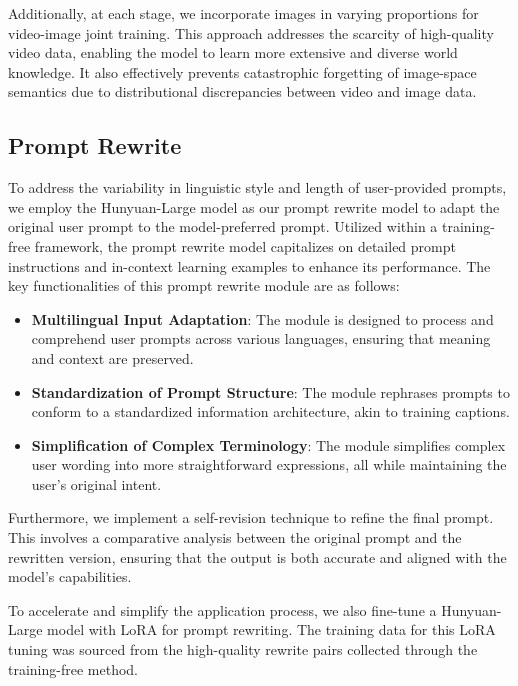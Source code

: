 Additionally, at each stage, we incorporate images in varying proportions for video-image joint training. This approach addresses the scarcity of high-quality video data, enabling the model to learn more extensive and diverse world knowledge. It also effectively prevents catastrophic forgetting of image-space semantics due to distributional discrepancies between video and image data.

\subsection{Prompt Rewrite} 
To address the variability in linguistic style and length of user-provided prompts, we employ the Hunyuan-Large model \cite{sun2024hunyuanlargeopensourcemoemodel} as our prompt rewrite model to adapt the original user prompt to the model-preferred prompt. Utilized within a training-free framework, the prompt rewrite model capitalizes on detailed prompt instructions and in-context learning examples to enhance its performance. The key functionalities of this prompt rewrite module are as follows:

\begin{itemize}
    \item \textbf{Multilingual Input Adaptation}: The module is designed to process and comprehend user prompts across various languages, ensuring that meaning and context are preserved.
    \item \textbf{Standardization of Prompt Structure}: The module rephrases prompts to conform to a standardized information architecture, akin to training captions.
    \item \textbf{Simplification of Complex Terminology}: The module simplifies complex user wording into more straightforward expressions, all while maintaining the user's original intent.
\end{itemize}

Furthermore, we implement a self-revision technique \cite{kim2024reex} to refine the final prompt. This involves a comparative analysis between the original prompt and the rewritten version, ensuring that the output is both accurate and aligned with the model's capabilities.

To accelerate and simplify the application process, we also fine-tune a Hunyuan-Large model with LoRA for prompt rewriting. The training data for this LoRA tuning was sourced from the high-quality rewrite pairs collected through the training-free method.


